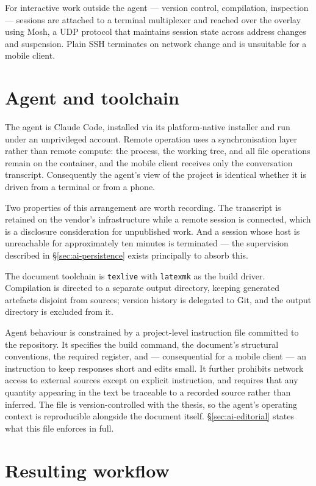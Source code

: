 For interactive work outside the agent --- version control, compilation, inspection --- sessions are attached to a terminal multiplexer and reached over the overlay using Mosh, a UDP protocol that maintains session state across address changes and suspension. Plain SSH terminates on network change and is unsuitable for a mobile client.

\section{Agent and toolchain}
\label{sec:ai-toolchain}

The agent is Claude Code, installed via its platform-native installer and run under an unprivileged account. Remote operation uses a synchronisation layer rather than remote compute: the process, the working tree, and all file operations remain on the container, and the mobile client receives only the conversation transcript. Consequently the agent's view of the project is identical whether it is driven from a terminal or from a phone.

Two properties of this arrangement are worth recording. The transcript is retained on the vendor's infrastructure while a remote session is connected, which is a disclosure consideration for unpublished work. And a session whose host is unreachable for approximately ten minutes is terminated --- the supervision described in \S\ref{sec:ai-persistence} exists principally to absorb this.

The document toolchain is \texttt{texlive} with \texttt{latexmk} as the build driver. Compilation is directed to a separate output directory, keeping generated artefacts disjoint from sources; version history is delegated to Git, and the output directory is excluded from it.

Agent behaviour is constrained by a project-level instruction file committed to the repository. It specifies the build command, the document's structural conventions, the required register, and --- consequential for a mobile client --- an instruction to keep responses short and edits small. It further prohibits network access to external sources except on explicit instruction, and requires that any quantity appearing in the text be traceable to a recorded source rather than inferred. The file is version-controlled with the thesis, so the agent's operating context is reproducible alongside the document itself. \S\ref{sec:ai-editorial} states what this file enforces in full.

\section{Resulting workflow}
\label{sec:ai-workflow}

